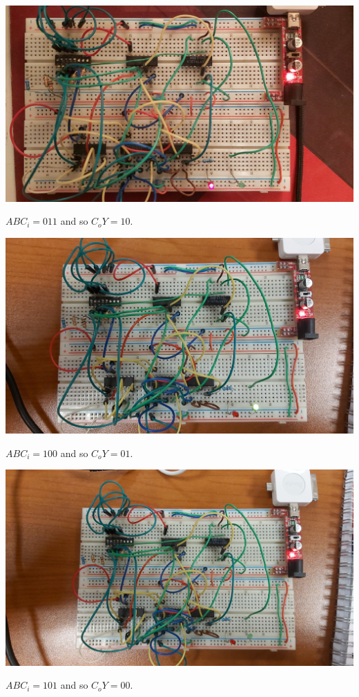 \documentclass{article}
\begin{document}
\vspace{2em}

\includegraphics[width=\textwidth]{./figures/01111.jpg}
\begin{center}
	$ABC_i = 011$ and so $C_o Y= 10$.
\end{center}

\includegraphics[angle=180, width=\textwidth]{./figures/10011.jpg}
\begin{center}
	$ABC_i = 100$ and so $C_o Y= 01$.
\end{center}

\vspace{2em}

\includegraphics[angle=180, width=\textwidth]{./figures/10111.jpg}
\begin{center}
	$ABC_i = 101$ and so $C_o Y= 00$.
\end{center}
\end{document}
